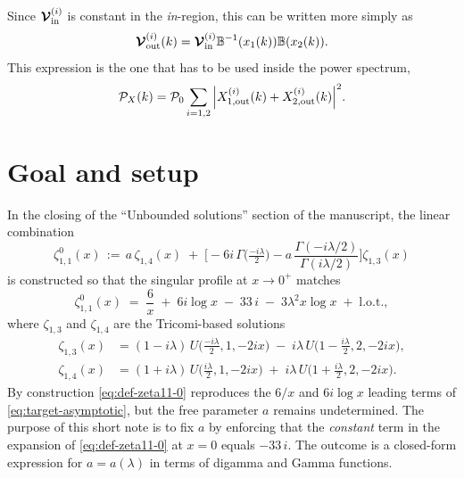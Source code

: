\documentclass[
 aip,
 jmp,
 amsmath,amssymb,
 reprint,
 nofootinbib,
]{revtex4-2}
\def\mV{{\vb*{\mathcal{V}}}}
\begin{document}
Since $\mV_{\text{in}}^{(i)}$ is constant in the \textit{in}-region, this can be written more simply as
\begin{equation}
    \mV_{\text{out}}^{(i)}(k)
    =
    \mV_{\text{in}}^{(i)}
    \mathbb{B}^{-1}(x_1(k))
    \mathbb{B}(x_2(k)).
\end{equation}
This expression is the one that has to be used inside the power spectrum,
\begin{equation}
    \mathcal{P}_{X}(k)
    =
    \mathcal{P}_0
    \sum_{i = 1,2}
    \abs{
        X_{1,\text{out}}^{(i)}(k)
        +
        X_{2,\text{out}}^{(i)}(k)
    }^2.
\end{equation}


\section{Goal and setup}

In the closing of the ``Unbounded solutions'' section of the manuscript, the linear combination
\begin{equation}\label{eq:def-zeta11-0}
    \zeta_{1,1}^{0}(x) \,:=\, a\,\zeta_{1,4}(x) \;+\; \Big[-6i\,\Gamma\!\big(\tfrac{-i\lambda}{2}\big) - a\,\frac{\Gamma(-i\lambda/2)}{\Gamma(i\lambda/2)}\Big]\zeta_{1,3}(x)
\end{equation}
is constructed so that the singular profile at $x\to 0^+$ matches
\begin{equation}\label{eq:target-asymptotic}
    \zeta_{1,1}^{0}(x) \;=\; \frac{6}{x} \;+\; 6 i \log x \;-\; 33\,i \;-\; 3\lambda^{2} x \log x \;+\; \text{l.o.t.},
\end{equation}
where $\zeta_{1,3}$ and $\zeta_{1,4}$ are the Tricomi-based solutions
\begin{align}
    \zeta_{1,3}(x) &= (1-i\lambda)\,U\!\big(\tfrac{-i\lambda}{2},1,-2ix\big) \;-\; i\lambda\,U\!\big(1-\tfrac{i\lambda}{2},2,-2ix\big), \label{eq:zeta13}\\
    \zeta_{1,4}(x) &= (1+i\lambda)\,U\!\big(\tfrac{i\lambda}{2},1,-2ix\big) \;+\; i\lambda\,U\!\big(1+\tfrac{i\lambda}{2},2,-2ix\big). \label{eq:zeta14}
\end{align}
By construction \eqref{eq:def-zeta11-0} reproduces the $6/x$ and $6i\log x$ leading terms of \eqref{eq:target-asymptotic}, but the free parameter $a$ remains undetermined. The purpose of this short note is to fix $a$ by enforcing that the \emph{constant} term in the expansion of \eqref{eq:def-zeta11-0} at $x=0$ equals $-33\,i$. The outcome is a closed-form expression for $a=a(\lambda)$ in terms of digamma and Gamma functions.
\end{document}

